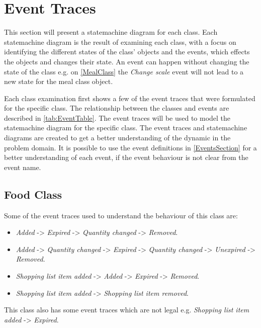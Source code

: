 \section{Event Traces} \label{EventTraces}
This section will present a statemachine diagram for each class. Each statemachine diagram is the result of examining each class, with a focus on identifying the different states of the class' objects and the events, which effects the objects and changes their state. An event can happen without changing the state of the class e.g. on \cref{MealClass} the \textit{Change scale} event will not lead to a new state for the meal class object.  

Each class examination first shows a few of the event traces that were formulated for the specific class. The relationship between the classes and events are described in \cref{tab:EventTable}. The event traces will be used to model the statemachine diagram for the specific class. The event traces and statemachine diagrams are created to get a better understanding of the dynamic in the problem domain. It is possible to use the event definitions in \cref{EventsSection} for a better understanding of each event, if the event behaviour is not clear from the event name.   

\subsection{Food Class}
Some of the event traces used to understand the behaviour of this class are:
\begin{itemize}
	\item \textit{Added} -> \textit{Expired} -> \textit{Quantity changed} -> \textit{Removed}.
	\item \textit{Added} -> \textit{Quantity changed} -> \textit{Expired} -> \textit{Quantity changed} -> \textit{Unexpired} -> \textit{Removed}.
	\item \textit{Shopping list item added} -> \textit{Added} -> \textit{Expired} -> \textit{Removed}.
	\item \textit{Shopping list item added} -> \textit{Shopping list item removed}.
\end{itemize}

This class also has some event traces which are not legal e.g. 
\textit{Shopping list item added} -> \textit{Expired}.

